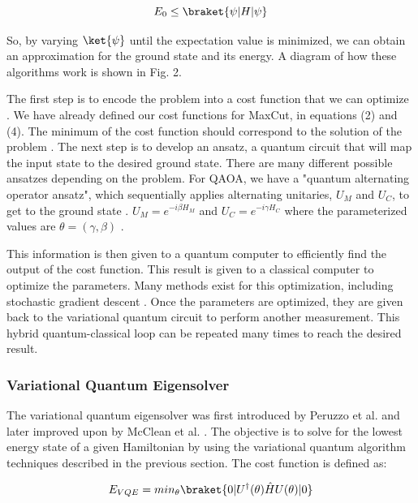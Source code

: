\begin{equation} 
        E_0  \leq  \braket{\psi|H|\psi}
    \end{equation}

So, by varying $\ket{\psi}$ until the expectation value is minimized, we can obtain an approximation for the ground state and its energy. A diagram of how these algorithms work is shown in Fig. 2. 

The first step is to encode the problem into a cost function that we can optimize \cite{vqa2021}. We have already defined our cost functions for MaxCut, in equations (2) and (4). The minimum of the cost function should correspond to the solution of the problem \cite{vqa2021}. The next step is to develop an ansatz, a quantum circuit that will map the input state to the desired ground state. There are many different possible ansatzes depending on the problem. For QAOA, we have a "quantum alternating operator ansatz", which sequentially applies alternating unitaries, $U_M$ and $U_C$, to get to the ground state \cite{vqa2021}. $U_M = e^{-i \beta H_M}$ and $U_C = e^{-i \gamma H_C}$ where the parameterized values are $\theta = (\gamma, \beta)$ \cite{vqa2021}.

This information is then given to a quantum computer to efficiently find the output of the cost function. This result is given to a classical computer to optimize the parameters. Many methods exist for this optimization, including stochastic gradient descent \cite{vqa2021}. Once the parameters are optimized, they are given back to the variational quantum circuit to perform another measurement. This hybrid quantum-classical loop can be repeated many times to reach the desired result.

\subsubsection{Variational Quantum Eigensolver}
The variational quantum eigensolver was first introduced by Peruzzo et al. \cite{vqe2014} and later improved upon by McClean et al. \cite{vqeExt2016}. The objective is to solve for the lowest energy state of a given Hamiltonian by using the variational quantum algorithm techniques described in the previous section. The cost function is defined as:

\begin{equation} 
        E_{VQE} =  min_\theta \braket{0|U^\dagger (\theta)\hat{H} U(\theta)|0}
    \end{equation}

